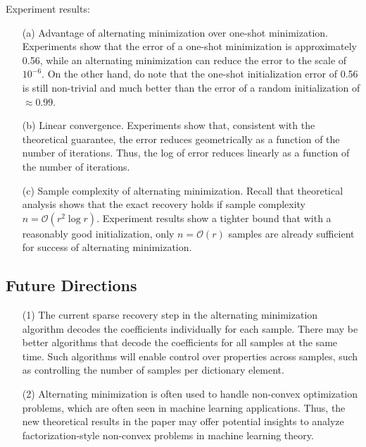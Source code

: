 Experiment results:
\begin{enumerate}
\item[(a)] Advantage of alternating minimization over one-shot minimization. Experiments show that the error of a one-shot minimization is approximately 0.56, while an alternating minimization can reduce the error to the scale of $10^{-6}$. On the other hand, do note that the one-shot initialization error of 0.56 is still non-trivial and much better than the error of a random initialization of $\approx 0.99$.

\item[(b)] Linear convergence. Experiments show that, consistent with the theoretical guarantee, the error reduces geometrically as a function of the number of iterations. Thus, the log of error reduces linearly as a function of the number of iterations. 

\item[(c)] Sample complexity of alternating minimization. Recall that theoretical analysis shows that the exact recovery holds if sample complexity $n = \mathcal{O}(r^2\log r)$. Experiment results show a tighter bound that with a reasonably good initialization, only $n = \mathcal{O}(r)$ samples are already sufficient for success of alternating minimization. 

\end{enumerate}

\subsection{Future Directions}

\begin{enumerate}
\item[(1)] The current sparse recovery step in the alternating minimization algorithm decodes the coefficients individually for each sample. There may be better algorithms that decode the coefficients for all samples at the same time. Such algorithms will enable control over properties across samples, such as controlling the number of samples per dictionary element. 

\item[(2)] Alternating minimization is often used to handle non-convex optimization problems, which are often seen in machine learning applications. Thus, the new theoretical results in the paper may offer potential insights to analyze factorization-style non-convex problems in machine learning theory. 
\end{enumerate}
